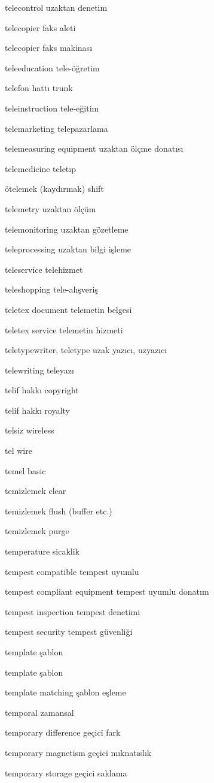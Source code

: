 \documentclass[12pt,fleqn]{article}\usepackage{../../common}
\begin{document}
telecontrol uzaktan denetim

telecopier faks aleti

telecopier faks makinası

teleeducation tele-öğretim

telefon hattı trunk

teleinstruction tele-eğitim

telemarketing telepazarlama

telemeasuring equipment uzaktan ölçme donatısı

telemedicine teletıp

ötelemek (kaydırmak) shift

telemetry uzaktan ölçüm

telemonitoring uzaktan gözetleme

teleprocessing uzaktan bilgi işleme

teleservice telehizmet

teleshopping tele-alışveriş

teletex document telemetin belgesi

teletex service telemetin hizmeti

teletypewriter, teletype uzak yazıcı, uzyazıcı

telewriting teleyazı

telif hakkı copyright

telif hakkı royalty

telsiz wireless

tel wire

temel basic

temizlemek clear

temizlemek flush (buffer etc.)

temizlemek purge

temperature sicaklik

tempest compatible tempest uyumlu

tempest compliant equipment tempest uyumlu donatım

tempest inspection tempest denetimi

tempest security tempest güvenliği

template şablon

template şablon

template matching şablon eşleme

temporal zamansal

temporary difference geçici fark

temporary magnetism geçici mıknatıslık

temporary storage geçici saklama
\end{document}
